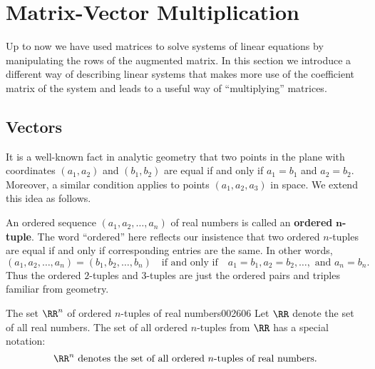 \section{Matrix-Vector Multiplication}
\label{sec:2_2}

Up to now we have used matrices to solve systems of linear equations by manipulating the rows of the augmented matrix. In this section we introduce a different way of describing linear systems that makes more use of the coefficient matrix of the system and leads to a useful way of ``multiplying'' matrices.


\subsection*{Vectors}


It is a well-known fact in analytic geometry that two points in the plane with coordinates $(a_{1}, a_{2})$ and $(b_{1}, b_{2})$ are equal if and only if $a_{1} = b_{1}$ and $a_{2} = b_{2}$. Moreover, a similar condition applies to points $(a_{1}, a_{2}, a_{3})$ in space. We extend this idea as follows.


An ordered sequence $(a_{1}, a_{2}, \dots, a_{n})$ of real numbers is called an \textbf{ordered} $\bm{n}$\textbf{-tuple}. The word ``ordered'' here reflects our insistence that two ordered $n$-tuples are equal if and only if corresponding entries are the same. In other words, 
\begin{equation*}
(a_{1}, a_{2}, \dots, a_{n}) = (b_{1}, b_{2}, \dots, b_{n}) \quad \mbox{if and only if} \quad a_{1} = b_{1}, a_{2} = b_{2}, \dots, \mbox{ and } a_{n} = b_{n}.
\end{equation*}
Thus the ordered $2$-tuples and $3$-tuples are just the ordered pairs and triples familiar from geometry.


\begin{definition}{The set $\RR^n$ of ordered $n$-tuples of real numbers}{002606}
Let $\RR$ denote the set of all real numbers. The set of {\normalfont all} ordered $n$-tuples from $\RR$ has a special notation:
\begin{equation*}
\RR^{n} \mbox{ denotes the set of all ordered }n\mbox{-tuples of real numbers.}
\end{equation*}
\end{definition}

